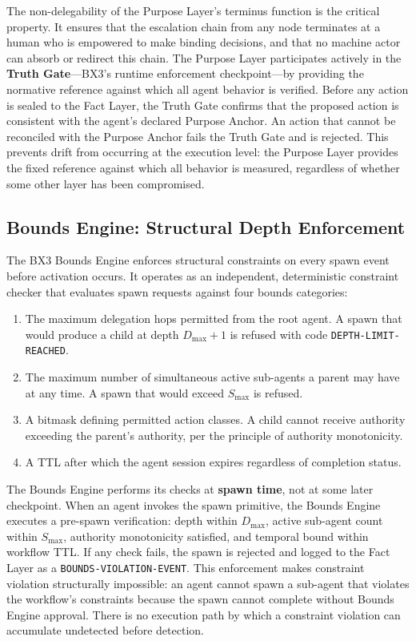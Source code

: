 The non-delegability of the Purpose Layer's terminus function is the critical property. It ensures that the escalation chain from any node terminates at a human who is empowered to make binding decisions, and that no machine actor can absorb or redirect this chain. The Purpose Layer participates actively in the \textbf{Truth Gate}---BX3's runtime enforcement checkpoint---by providing the normative reference against which all agent behavior is verified. Before any action is sealed to the Fact Layer, the Truth Gate confirms that the proposed action is consistent with the agent's declared Purpose Anchor. An action that cannot be reconciled with the Purpose Anchor fails the Truth Gate and is rejected. This prevents drift from occurring at the execution level: the Purpose Layer provides the fixed reference against which all behavior is measured, regardless of whether some other layer has been compromised.

\subsection{Bounds Engine: Structural Depth Enforcement}

The BX3 Bounds Engine enforces structural constraints on every spawn event before activation occurs. It operates as an independent, deterministic constraint checker that evaluates spawn requests against four bounds categories:

\begin{enumerate}
  \item[\textbf{Depth Bound ($D_{\max}$):}] The maximum delegation hops permitted from the root agent. A spawn that would produce a child at depth $D_{\max} + 1$ is refused with code \texttt{DEPTH-LIMIT-REACHED}.
  \item[\textbf{Scope Bound ($S_{\max}$):}] The maximum number of simultaneous active sub-agents a parent may have at any time. A spawn that would exceed $S_{\max}$ is refused.
  \item[\textbf{Authority Bound:}] A bitmask defining permitted action classes. A child cannot receive authority exceeding the parent's authority, per the principle of authority monotonicity.
  \item[\textbf{Temporal Bound ($T_{\text{bounds}}$):}] A TTL after which the agent session expires regardless of completion status.
\end{enumerate}

The Bounds Engine performs its checks at \textbf{spawn time}, not at some later checkpoint. When an agent invokes the spawn primitive, the Bounds Engine executes a pre-spawn verification: depth within $D_{\max}$, active sub-agent count within $S_{\max}$, authority monotonicity satisfied, and temporal bound within workflow TTL. If any check fails, the spawn is rejected and logged to the Fact Layer as a \texttt{BOUNDS-VIOLATION-EVENT}. This enforcement makes constraint violation structurally impossible: an agent cannot spawn a sub-agent that violates the workflow's constraints because the spawn cannot complete without Bounds Engine approval. There is no execution path by which a constraint violation can accumulate undetected before detection.

